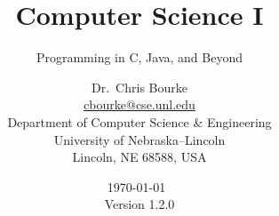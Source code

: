 \usepackage[yyyymmdd,hhmmss]{datetime}

\theoremstyle{definition}
\newtheorem{exer}{Exercise}

\newtheorem{problem}{Problem}


\newcommand{\Neg}{\ensuremath{\neg}}
\renewcommand{\And}{\ensuremath{\mathbin{\textsc{And}}}}
\newcommand{\Or}{\ensuremath{\mathbin{\textsc{Or}}}}
\newcommand{\True}{\emph{true}\xspace}
\newcommand{\False}{\emph{false}\xspace}
\newcommand{\Null}{\textsc{Null}}

\title{Computer Science I}
\subtitle{Programming in C, Java, and Beyond}
\author{Dr.\ Chris Bourke\\
        \href{mailto:cbourke@cse.unl.edu}{cbourke@cse.unl.edu} \\
        Department of Computer Science \& Engineering\\
        University of Nebraska--Lincoln\\
        Lincoln, NE 68588, USA
}

\date{\today\  \currenttime \\ Version 1.2.0}
